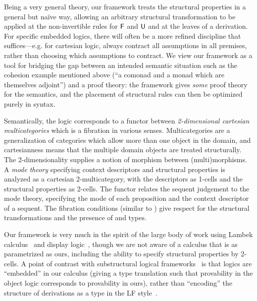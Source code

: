 Being a very general theory, our framework treats the structural
properties in a general but na\"ive way, allowing an arbitrary
structural transformation to be applied at the non-invertible rules for
$\mathsf{F}$ and $\mathsf{U}$ and at the leaves of a derivation.  For specific
embedded logics, there will often be a more refined discipline that
suffices---e.g. for cartesian logic, always contract all assumptions
in all premises, rather than choosing which assumptions to contract.  We
view our framework as a tool for bridging the gap between an intended
semantic situation such as the cohesion example mentioned above (``a
comonad and a monad which are themselves adjoint'') and a proof theory:
the framework gives \emph{some} proof theory for the semantics, and the
placement of structural rules can then be optimized purely in syntax.

Semantically, the logic corresponds to a functor between
\emph{2-dimensional cartesian multicategories} which is a fibration in
various senses.  Multicategories are a generalization of categories
which allow more than one object in the domain, and cartesianness means
that the multiple domain objects are treated structurally.  The
2-dimensionality supplies a notion of morphism between (multi)morphisms.
A \emph{mode theory} specifying context descriptors and structural
properties is analyzed as a cartesian 2-multicategory, with the
descriptors as 1-cells and the structural properties as 2-cells.  The
functor relates the sequent judgement to the mode theory, specifying the
mode of each proposition and the context descriptor of a sequent.  The
fibration conditions (similar to
\citep{hermida02fibrations,hormann15multicategories}) give respect for
the structural transformations and the presence of  and 
types.

Our framework is very much in the spirit of the large body of work using
Lambek calculus~\citep{lambek58calculus} and display
logic~\citep{belnap82display}, though we are not aware of a calculus
that is as parametrized as ours, including the ability to specify
structural properties by 2-cells.  A point of contrast with
substructural logical
frameworks~\citep{cervesatopfenning02llf,watkins+03clf-tr,reed09thesis}
is that logics are ``embedded'' in our calculus (giving a type
translation such that provability in the object logic corresponds to
provability in ours), rather than ``encoding'' the structure of
derivations as a type in the LF style~\citep{hhp93lf}.

